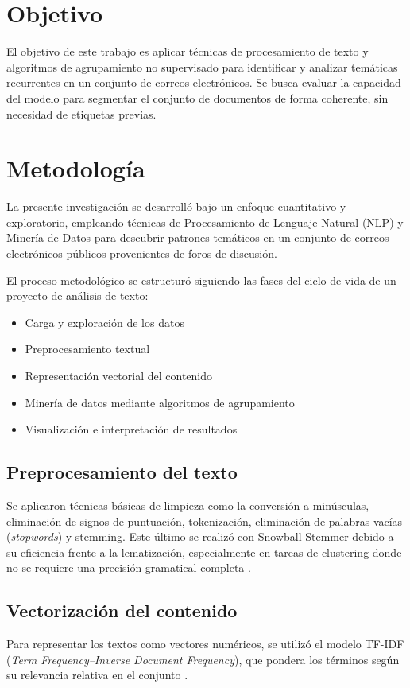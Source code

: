 \documentclass[journal]{IEEEtran}
\begin{document}
\section{Objetivo}
El objetivo de este trabajo es aplicar técnicas de procesamiento de texto y algoritmos de agrupamiento no supervisado para identificar y analizar temáticas recurrentes en un conjunto de correos electrónicos. Se busca evaluar la capacidad del modelo para segmentar el conjunto de documentos de forma coherente, sin necesidad de etiquetas previas.

\section{Metodología}
La presente investigación se desarrolló bajo un enfoque cuantitativo y exploratorio, empleando técnicas de Procesamiento de Lenguaje Natural (NLP) y Minería de Datos para descubrir patrones temáticos en un conjunto de correos electrónicos públicos provenientes de foros de discusión.

El proceso metodológico se estructuró siguiendo las fases del ciclo de vida de un proyecto de análisis de texto:
\begin{itemize}
    \item Carga y exploración de los datos
    \item Preprocesamiento textual
    \item Representación vectorial del contenido
    \item Minería de datos mediante algoritmos de agrupamiento
    \item Visualización e interpretación de resultados
\end{itemize}

\subsection{Preprocesamiento del texto}
Se aplicaron técnicas básicas de limpieza como la conversión a minúsculas, eliminación de signos de puntuación, tokenización, eliminación de palabras vacías (\textit{stopwords}) y stemming. Este último se realizó con Snowball Stemmer debido a su eficiencia frente a la lematización, especialmente en tareas de clustering donde no se requiere una precisión gramatical completa \cite{manning2008introduction}.

\subsection{Vectorización del contenido}
Para representar los textos como vectores numéricos, se utilizó el modelo TF-IDF (\textit{Term Frequency–Inverse Document Frequency}), que pondera los términos según su relevancia relativa en el conjunto \cite{ramos2003using}.
\end{document}
